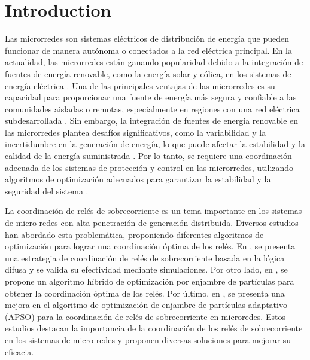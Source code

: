 \documentclass[journal,article,submit,pdftex,moreauthors]{Definitions/mdpi}
\begin{document}


\section{Introduction}

Las microrredes son sistemas eléctricos de distribución de energía que pueden funcionar de manera autónoma o conectados a la red eléctrica principal. En la actualidad, las microrredes están ganando popularidad debido a la integración de fuentes de energía renovable, como la energía solar y eólica, en los sistemas de energía eléctrica \cite{Farooq2018,Chen2020}. Una de las principales ventajas de las microrredes es su capacidad para proporcionar una fuente de energía más segura y confiable a las comunidades aisladas o remotas, especialmente en regiones con una red eléctrica subdesarrollada \cite{Farooq2018}. Sin embargo, la integración de fuentes de energía renovable en las microrredes plantea desafíos significativos, como la variabilidad y la incertidumbre en la generación de energía, lo que puede afectar la estabilidad y la calidad de la energía suministrada \cite{Khan2019, Wang2020}. Por lo tanto, se requiere una coordinación adecuada de los sistemas de protección y control en las microrredes, utilizando algoritmos de optimización adecuados para garantizar la estabilidad y la seguridad del sistema \cite{Akhtar2021,chen2021coordination,li2021improved}.

La coordinación de relés de sobrecorriente es un tema importante en los sistemas de micro-redes con alta penetración de generación distribuida. Diversos estudios han abordado esta problemática, proponiendo diferentes algoritmos de optimización para lograr una coordinación óptima de los relés. En \cite{chen2021coordination}, se presenta una estrategia de coordinación de relés de sobrecorriente basada en la lógica difusa y se valida su efectividad mediante simulaciones. Por otro lado, en \cite{akhtar2021optimal}, se propone un algoritmo híbrido de optimización por enjambre de partículas para obtener la coordinación óptima de los relés. Por último, en \cite{li2021improved}, se presenta una mejora en el algoritmo de optimización de enjambre de partículas adaptativo (APSO) para la coordinación de relés de sobrecorriente en microredes. Estos estudios destacan la importancia de la coordinación de los relés de sobrecorriente en los sistemas de micro-redes y proponen diversas soluciones para mejorar su eficacia.

\end{document}
